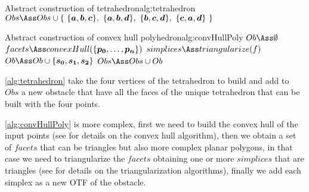 \documentclass[dissertation.tex]{subfiles}
\begin{document}
\begin{algo}{Abstract construction of tetrahedron}{alg:tetrahedron}
  \State $Obs\Ass Obs\cup\{\ \{\ve{a},\ve{b},\ve{c}\},\ \{\ve{a},\ve{b},\ve{d}\},\ \{\ve{b},\ve{c},\ve{d}\},\ \{\ve{c},\ve{a},\ve{d}\}\ \}$
  \EndProcedure
\end{algo}
\begin{algo}{Abstract construction of convex hull
    polyhedron}{alg:convHullPoly}
  \State $Ob\Ass\emptyset$
  \State $facets\Ass convexHull(\{\ve{p_0},\dots,\ve{p_n}\})$
  \State $simplices\Ass triangularize(f)$
  \State $Ob\Ass Ob\cup\{\ve{s_0},\ve{s_1},\ve{s_2}\}$
  \EndFor
  \EndFor
  \State $Obs\Ass Obs\cup Ob$
  \EndProcedure
\end{algo}
\cref{alg:tetrahedron} take the four vertices of the tetrahedron to
build and add to $Obs$ a new obstacle that have all the faces of the
unique tetrahedron that can be built with the four
points.

\cref{alg:convHullPoly} is more complex, first we need to build the
convex hull of the input points (see \cite{deberg} for details on the
convex hull algorithm), then we obtain a set of $facets$ that can be
triangles but also more complex planar polygons, in that case we need
to triangularize the $facets$ obtaining one or more $simplices$ that
are triangles (see \cite{deberg} for details on the triangularization
algorithms), finally we add each simplex as a new \ac{OTF} of the
obstacle.
\end{document}
